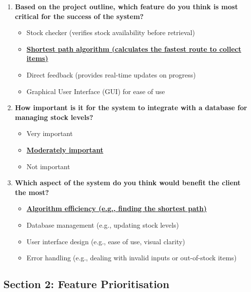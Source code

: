 \begin{enumerate}
    \item \textbf{Based on the project outline, which feature do you think is most critical for the success of the system?}
    \begin{itemize}
        \item Stock checker (verifies stock availability before retrieval)
        \item \textbf{\underline{Shortest path algorithm (calculates the fastest route to collect items)}}
        \item Direct feedback (provides real-time updates on progress)
        \item Graphical User Interface (GUI) for ease of use
    \end{itemize}

    \item \textbf{How important is it for the system to integrate with a database for managing stock levels?}
    \begin{itemize}
        \item Very important
        \item \textbf{\underline{Moderately important}}
        \item Not important
    \end{itemize}

    \item \textbf{Which aspect of the system do you think would benefit the client the most?}
    \begin{itemize}
        \item \textbf{\underline{Algorithm efficiency (e.g., finding the shortest path)}}
        \item Database management (e.g., updating stock levels)
        \item User interface design (e.g., ease of use, visual clarity)
        \item Error handling (e.g., dealing with invalid inputs or out-of-stock items)
    \end{itemize}

    
\end{enumerate}

\newpage

\subsection*{Section 2: Feature Prioritisation}

